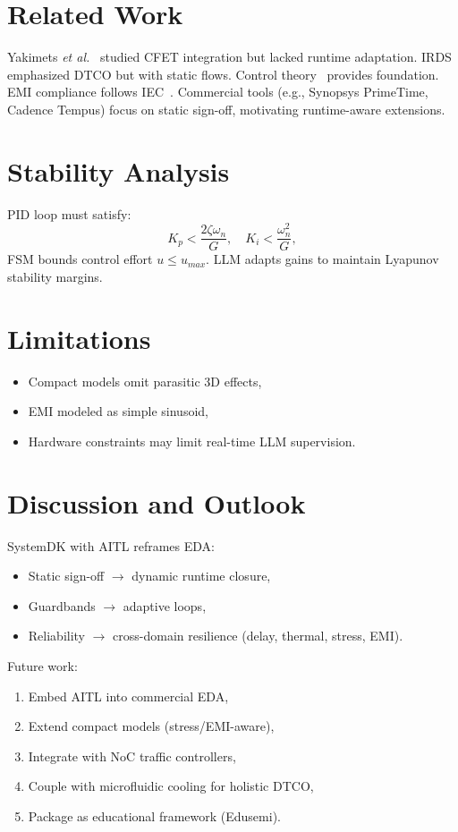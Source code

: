 \documentclass[conference]{IEEEtran}
\begin{document}
\section{Related Work}
Yakimets \textit{et al.}~\cite{yakimets2020} studied CFET integration but lacked runtime adaptation.  
IRDS~\cite{irds2023} emphasized DTCO but with static flows.  
Control theory~\cite{franklin2015,anderson2007,khalil2002} provides foundation.  
EMI compliance follows IEC~\cite{iec2019}.  
Commercial tools (e.g., Synopsys PrimeTime, Cadence Tempus) focus on static sign-off, motivating runtime-aware extensions.

\section{Stability Analysis}
PID loop must satisfy:
\begin{equation}
K_p < \frac{2\zeta \omega_n}{G}, \quad K_i < \frac{\omega_n^2}{G},
\end{equation}
FSM bounds control effort $u \le u_{max}$.  
LLM adapts gains to maintain Lyapunov stability margins.

\section{Limitations}
\begin{itemize}
    \item Compact models omit parasitic 3D effects,
    \item EMI modeled as simple sinusoid,
    \item Hardware constraints may limit real-time LLM supervision.
\end{itemize}

\section{Discussion and Outlook}
SystemDK with AITL reframes EDA:
\begin{itemize}
    \item Static sign-off $\rightarrow$ dynamic runtime closure,
    \item Guardbands $\rightarrow$ adaptive loops,
    \item Reliability $\rightarrow$ cross-domain resilience (delay, thermal, stress, EMI).
\end{itemize}

Future work:
\begin{enumerate}
    \item Embed AITL into commercial EDA,
    \item Extend compact models (stress/EMI-aware),
    \item Integrate with NoC traffic controllers,
    \item Couple with microfluidic cooling for holistic DTCO,
    \item Package as educational framework (Edusemi).
\end{enumerate}
\end{document}
